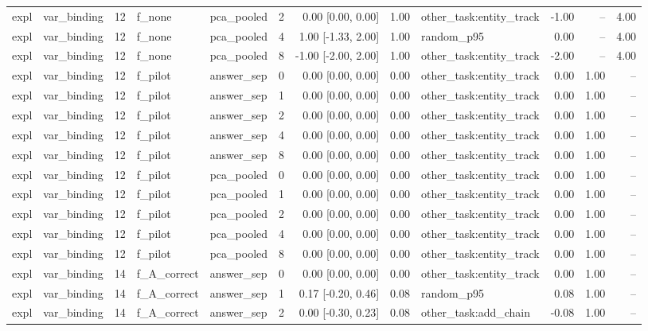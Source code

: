 \begin{tabular}{llrllrrrlrrr}
expl & var\_binding & 12 & f\_none & pca\_pooled & 2 & 0.00 [0.00, 0.00] & 1.00 & other\_task:entity\_track & -1.00 & -- & 4.00 \\
expl & var\_binding & 12 & f\_none & pca\_pooled & 4 & 1.00 [-1.33, 2.00] & 1.00 & random\_p95 & 0.00 & -- & 4.00 \\
expl & var\_binding & 12 & f\_none & pca\_pooled & 8 & -1.00 [-2.00, 2.00] & 1.00 & other\_task:entity\_track & -2.00 & -- & 4.00 \\
expl & var\_binding & 12 & f\_pilot & answer\_sep & 0 & 0.00 [0.00, 0.00] & 0.00 & other\_task:entity\_track & 0.00 & 1.00 & -- \\
expl & var\_binding & 12 & f\_pilot & answer\_sep & 1 & 0.00 [0.00, 0.00] & 0.00 & other\_task:entity\_track & 0.00 & 1.00 & -- \\
expl & var\_binding & 12 & f\_pilot & answer\_sep & 2 & 0.00 [0.00, 0.00] & 0.00 & other\_task:entity\_track & 0.00 & 1.00 & -- \\
expl & var\_binding & 12 & f\_pilot & answer\_sep & 4 & 0.00 [0.00, 0.00] & 0.00 & other\_task:entity\_track & 0.00 & 1.00 & -- \\
expl & var\_binding & 12 & f\_pilot & answer\_sep & 8 & 0.00 [0.00, 0.00] & 0.00 & other\_task:entity\_track & 0.00 & 1.00 & -- \\
expl & var\_binding & 12 & f\_pilot & pca\_pooled & 0 & 0.00 [0.00, 0.00] & 0.00 & other\_task:entity\_track & 0.00 & 1.00 & -- \\
expl & var\_binding & 12 & f\_pilot & pca\_pooled & 1 & 0.00 [0.00, 0.00] & 0.00 & other\_task:entity\_track & 0.00 & 1.00 & -- \\
expl & var\_binding & 12 & f\_pilot & pca\_pooled & 2 & 0.00 [0.00, 0.00] & 0.00 & other\_task:entity\_track & 0.00 & 1.00 & -- \\
expl & var\_binding & 12 & f\_pilot & pca\_pooled & 4 & 0.00 [0.00, 0.00] & 0.00 & other\_task:entity\_track & 0.00 & 1.00 & -- \\
expl & var\_binding & 12 & f\_pilot & pca\_pooled & 8 & 0.00 [0.00, 0.00] & 0.00 & other\_task:entity\_track & 0.00 & 1.00 & -- \\
expl & var\_binding & 14 & f\_A\_correct & answer\_sep & 0 & 0.00 [0.00, 0.00] & 0.00 & other\_task:entity\_track & 0.00 & 1.00 & -- \\
expl & var\_binding & 14 & f\_A\_correct & answer\_sep & 1 & 0.17 [-0.20, 0.46] & 0.08 & random\_p95 & 0.08 & 1.00 & -- \\
expl & var\_binding & 14 & f\_A\_correct & answer\_sep & 2 & 0.00 [-0.30, 0.23] & 0.08 & other\_task:add\_chain & -0.08 & 1.00 & -- \\

\end{tabular}
